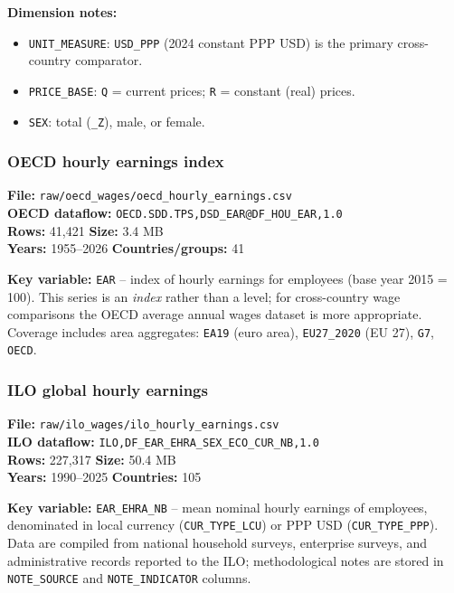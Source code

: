 \documentclass[11pt,a4paper]{article}
\newcommand{\code}[1]{\texttt{#1}}
\begin{document}
\noindent\textbf{Dimension notes:}
\begin{itemize}[noitemsep]
    \item \texttt{UNIT\_MEASURE}: \texttt{USD\_PPP} (2024 constant PPP USD) is the primary cross-country comparator.
    \item \texttt{PRICE\_BASE}: \texttt{Q} = current prices; \texttt{R} = constant (real) prices.
    \item \texttt{SEX}: total (\texttt{\_Z}), male, or female.
\end{itemize}

\subsubsection{OECD hourly earnings index}

\textbf{File:} \texttt{raw/oecd\_wages/oecd\_hourly\_earnings.csv}\\
\textbf{OECD dataflow:} \texttt{OECD.SDD.TPS,DSD\_EAR@DF\_HOU\_EAR,1.0}\\
\textbf{Rows:} 41{,}421 \quad \textbf{Size:} 3.4 MB\\
\textbf{Years:} 1955--2026 \quad \textbf{Countries/groups:} 41

\noindent\textbf{Key variable:} \code{EAR} -- index of hourly earnings for employees (base year 2015 = 100).  This series is an \emph{index} rather than a level; for cross-country wage comparisons the OECD average annual wages dataset is more appropriate.  Coverage includes area aggregates: \texttt{EA19} (euro area), \texttt{EU27\_2020} (EU 27), \texttt{G7}, \texttt{OECD}.

\subsubsection{ILO global hourly earnings}

\textbf{File:} \texttt{raw/ilo\_wages/ilo\_hourly\_earnings.csv}\\
\textbf{ILO dataflow:} \texttt{ILO,DF\_EAR\_EHRA\_SEX\_ECO\_CUR\_NB,1.0}\\
\textbf{Rows:} 227{,}317 \quad \textbf{Size:} 50.4 MB\\
\textbf{Years:} 1990--2025 \quad \textbf{Countries:} 105

\noindent\textbf{Key variable:} \code{EAR\_EHRA\_NB} -- mean nominal hourly earnings of employees, denominated in local currency (\texttt{CUR\_TYPE\_LCU}) or PPP USD (\texttt{CUR\_TYPE\_PPP}).  Data are compiled from national household surveys, enterprise surveys, and administrative records reported to the ILO; methodological notes are stored in \texttt{NOTE\_SOURCE} and \texttt{NOTE\_INDICATOR} columns.
\end{document}
